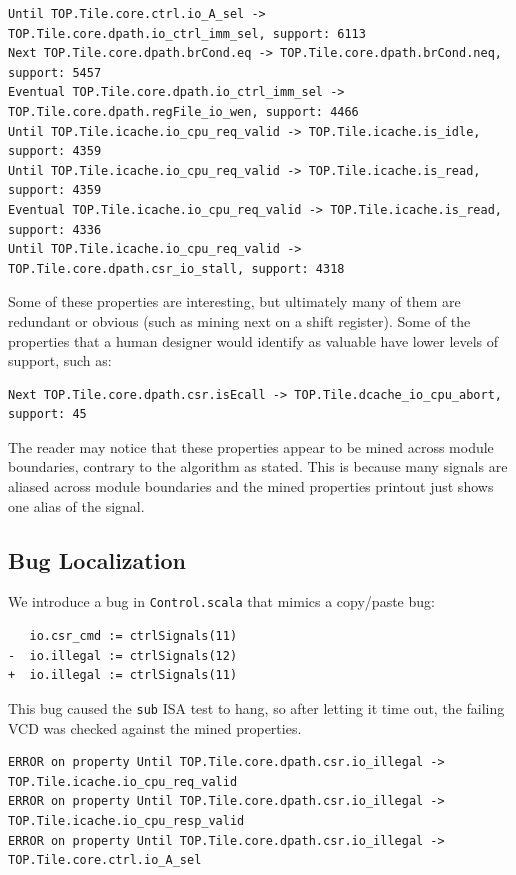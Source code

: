 \documentclass[acmlarge,11pt,nonacm]{acmart}
\begin{document}
\begin{verbatim}
Until TOP.Tile.core.ctrl.io_A_sel -> TOP.Tile.core.dpath.io_ctrl_imm_sel, support: 6113
Next TOP.Tile.core.dpath.brCond.eq -> TOP.Tile.core.dpath.brCond.neq, support: 5457
Eventual TOP.Tile.core.dpath.io_ctrl_imm_sel -> TOP.Tile.core.dpath.regFile_io_wen, support: 4466
Until TOP.Tile.icache.io_cpu_req_valid -> TOP.Tile.icache.is_idle, support: 4359
Until TOP.Tile.icache.io_cpu_req_valid -> TOP.Tile.icache.is_read, support: 4359
Eventual TOP.Tile.icache.io_cpu_req_valid -> TOP.Tile.icache.is_read, support: 4336
Until TOP.Tile.icache.io_cpu_req_valid -> TOP.Tile.core.dpath.csr_io_stall, support: 4318
\end{verbatim}

Some of these properties are interesting, but ultimately many of them are redundant or obvious (such as mining next on a shift register).
Some of the properties that a human designer would identify as valuable have lower levels of support, such as:

\begin{verbatim}
Next TOP.Tile.core.dpath.csr.isEcall -> TOP.Tile.dcache_io_cpu_abort, support: 45
\end{verbatim}

The reader may notice that these properties appear to be mined across module boundaries, contrary to the algorithm as stated.
This is because many signals are aliased across module boundaries and the mined properties printout just shows one alias of the signal.

\subsection{Bug Localization}
We introduce a bug in \texttt{Control.scala} that mimics a copy/paste bug:
\begin{verbatim}
   io.csr_cmd := ctrlSignals(11)
-  io.illegal := ctrlSignals(12)
+  io.illegal := ctrlSignals(11)
\end{verbatim}
This bug caused the \texttt{sub} ISA test to hang, so after letting it time out, the failing VCD was checked against the mined properties.
\begin{verbatim}
ERROR on property Until TOP.Tile.core.dpath.csr.io_illegal -> TOP.Tile.icache.io_cpu_req_valid
ERROR on property Until TOP.Tile.core.dpath.csr.io_illegal -> TOP.Tile.icache.io_cpu_resp_valid
ERROR on property Until TOP.Tile.core.dpath.csr.io_illegal -> TOP.Tile.core.ctrl.io_A_sel
\end{verbatim}
\end{document}
